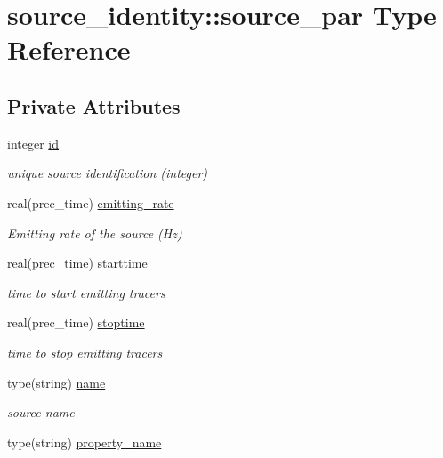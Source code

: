 \hypertarget{structsource__identity_1_1source__par}{}\section{source\+\_\+identity\+:\+:source\+\_\+par Type Reference}
\label{structsource__identity_1_1source__par}
\subsection*{Private Attributes}
\begin{DoxyCompactItemize}
\item 
integer \mbox{\hyperlink{structsource__identity_1_1source__par_a05b6d325908a1b552f98dada275a3465}{id}}
\begin{DoxyCompactList}\small\item\em unique source identification (integer) \end{DoxyCompactList}\item 
real(prec\+\_\+time) \mbox{\hyperlink{structsource__identity_1_1source__par_a746a02960ffcba9f699ae45fa55dd8b4}{emitting\+\_\+rate}}
\begin{DoxyCompactList}\small\item\em Emitting rate of the source (Hz) \end{DoxyCompactList}\item 
real(prec\+\_\+time) \mbox{\hyperlink{structsource__identity_1_1source__par_a045a39745c631b294c313ba1112ec9f4}{starttime}}
\begin{DoxyCompactList}\small\item\em time to start emitting tracers \end{DoxyCompactList}\item 
real(prec\+\_\+time) \mbox{\hyperlink{structsource__identity_1_1source__par_a3ab5e22242b41bdcd56480b9d0496efa}{stoptime}}
\begin{DoxyCompactList}\small\item\em time to stop emitting tracers \end{DoxyCompactList}\item 
type(string) \mbox{\hyperlink{structsource__identity_1_1source__par_a71ef7dc8c6268d014247e0bca3005311}{name}}
\begin{DoxyCompactList}\small\item\em source name \end{DoxyCompactList}\item 
type(string) \mbox{\hyperlink{structsource__identity_1_1source__par_a0205c62b7673e76c7f1de2bfcecabd84}{property\+\_\+name}}

\end{DoxyCompactItemize}
